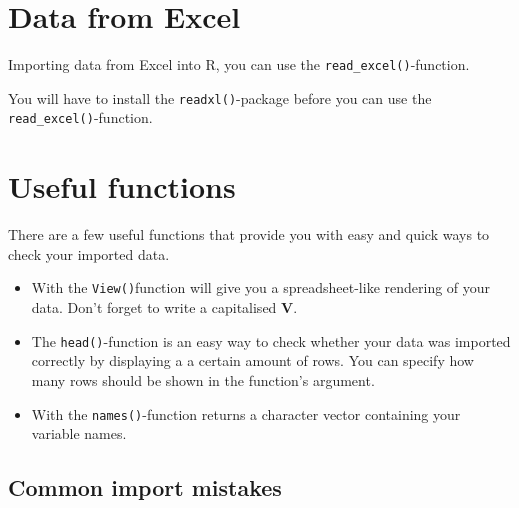 \documentclass[
  letterpaper,
  DIV=11,
  numbers=noendperiod,
  oneside]{scrreprt}
\begin{document}
\hypertarget{data-from-excel}{%
\section{Data from Excel}\label{data-from-excel}}

Importing data from Excel into R, you can use the
\texttt{read\_excel()}-function.

\begin{tcolorbox}[enhanced jigsaw, colframe=quarto-callout-important-color-frame, bottomrule=.15mm, left=2mm, arc=.35mm, toprule=.15mm, opacityback=0, colback=white, rightrule=.15mm, breakable, leftrule=.75mm]
\begin{minipage}[t]{5.5mm}
\textcolor{quarto-callout-important-color}{\faExclamation}
\end{minipage}%
\begin{minipage}[t]{\textwidth - 5.5mm}

You will have to install the \texttt{readxl()}-package before you can
use the \texttt{read\_excel()}-function.

\end{minipage}%
\end{tcolorbox}

\hypertarget{useful-functions}{%
\section{Useful functions}\label{useful-functions}}

There are a few useful functions that provide you with easy and quick
ways to check your imported data.

\begin{itemize}
\item
  With the \texttt{View()}function will give you a spreadsheet-like
  rendering of your data. Don't forget to write a capitalised
  \textbf{V}.
\item
  The \texttt{head()}-function is an easy way to check whether your data
  was imported correctly by displaying a a certain amount of rows. You
  can specify how many rows should be shown in the function's argument.
\item
  With the \texttt{names()}-function returns a character vector
  containing your variable names.
\end{itemize}

\hypertarget{common-import-mistakes}{%
\subsection{Common import mistakes}\label{common-import-mistakes}}
\end{document}
